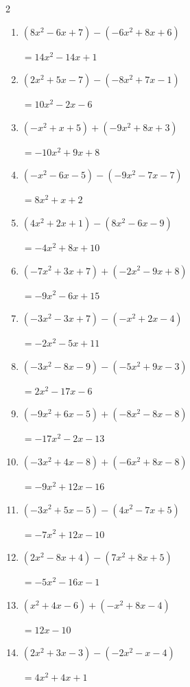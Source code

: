 \begin{multicols}{2}
\begin{enumerate}
        $=-9x^{2}-16x+2$

  \item $(8x^{2}-6x+7)-(-6x^{2}+8x+6)$

        $=14x^{2}-14x+1$

  \item $(2x^{2}+5x-7)-(-8x^{2}+7x-1)$

        $=10x^{2}-2x-6$

  \item $(-x^{2}+x+5)+(-9x^{2}+8x+3)$

        $=-10x^{2}+9x+8$

  \item $(-x^{2}-6x-5)-(-9x^{2}-7x-7)$

        $=8x^{2}+x+2$

  \item $(4x^{2}+2x+1)-(8x^{2}-6x-9)$

        $=-4x^{2}+8x+10$

  \item $(-7x^{2}+3x+7)+(-2x^{2}-9x+8)$

        $=-9x^{2}-6x+15$

  \item $(-3x^{2}-3x+7)-(-x^{2}+2x-4)$

        $=-2x^{2}-5x+11$

  \item $(-3x^{2}-8x-9)-(-5x^{2}+9x-3)$

        $=2x^{2}-17x-6$

  \item $(-9x^{2}+6x-5)+(-8x^{2}-8x-8)$

        $=-17x^{2}-2x-13$

  \item $(-3x^{2}+4x-8)+(-6x^{2}+8x-8)$

        $=-9x^{2}+12x-16$

  \item $(-3x^{2}+5x-5)-(4x^{2}-7x+5)$

        $=-7x^{2}+12x-10$

  \item $(2x^{2}-8x+4)-(7x^{2}+8x+5)$

        $=-5x^{2}-16x-1$

  \item $(x^{2}+4x-6)+(-x^{2}+8x-4)$

        $=12x-10$

  \item $(2x^{2}+3x-3)-(-2x^{2}-x-4)$

        $=4x^{2}+4x+1$


\end{enumerate}
\end{multicols}

